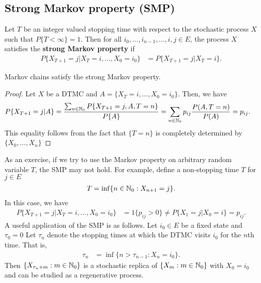 \documentclass[a4paper,10pt,english]{article}
\begin{document}
\subsection{Strong Markov property (SMP)}
Let $T$ be an integer valued stopping time with respect to the stochastic process $X$ such that $P\{T< \infty\}=1$. 
Then for all $i_0, \dots, i_{n-1},\dots, i,j \in E$, the process $X$ satisfies the \textbf{strong Markov property} if 
\begin{align*}
P\{X_{T+1} = j|X_{T} = i, \dots,X_0 =i_0\} &= P\{X_{T+1} = j|X_{T} = i\}.
\end{align*}
\begin{lem}
Markov chains satisfy the strong Markov property. 
\end{lem}
\begin{proof}
Let $X$ be a DTMC and $A = \{X_{T} = i, \dots, X_0 =i_0\}$. 
Then, we have 
\begin{align*}
P\{X_{T+1} = j|A\} &=\frac{\sum_{n \in \N_0}P\{X_{T+1}=j, A, T = n\}}{P\{A\}} %
= \sum_{n \in \N_0} p_{ij}\frac{P(A, T =n)}{P(A)} = p_{ij}.
\end{align*}
This equality follows from the fact that $\{T = n\}$ is completely determined by $\{X_0, \dots, X_n\}$
\end{proof}
As an exercise, if we try to use the Markov property on arbitrary random variable $T$, the SMP may not hold. 
For example, define a non-stopping time $T$ for $j \in E$
\begin{align*}
T=\inf \{n \in \mathbb{N}_0: X_{n+1}=j\}.
\end{align*}
In this case, we have 
\begin{align*}
P\{X_{T+1}=j|X_T=i,\dots, X_0 = i_0\}&= 1\{p_{ij} > 0\} \neq  P \{X_1=j |X_0=i\} = p_{ij}.
\end{align*}
A useful application of the SMP is as follows. 
Let $i_0 \in E$ be a fixed state and $\tau_0 = 0$
Let $\tau_n$ denote the stopping times at which the DTMC visits $i_0$ for the $n$th time. 
That is,
\begin{align*} 
\tau_n &= \inf\{n > \tau_{n-1}: X_n = i_0\}. 
\end{align*}
Then $\{X_{\tau_n + m}: m \in \mathbb{N}_0\}$ is a stochastic replica of $\{X_m: m \in \mathbb{N}_0\}$ with $X_0 = i_0$ and can be studied as a regenerative process. 
\end{document}
